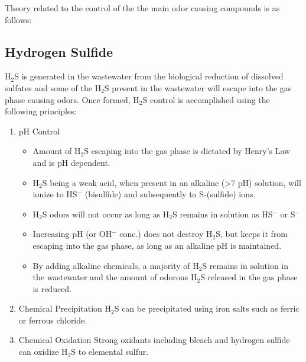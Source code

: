 Theory related to the control of the the main odor causing compounds is as follows:

\subsection{Hydrogen Sulfide}
H$_2$S is generated in the wastewater from the biological reduction of dissolved sulfates and some of the H$_2$S present in the wastewater will escape into the gas phase causing odors.  Once formed, H$_2$S control is accomplished using the following principles:
\begin{enumerate}
\item pH Control
\begin{itemize}
\item Amount of H$_2$S escaping into the gas phase is dictated by Henry’s Law and is pH dependent.
\item H$_2$S being a weak acid, when present in an alkaline (>7 pH) solution, will ionize to HS$^-$ (bisulfide) and subsequently to S-(sulfide) ions.
\item H$_2$S odors will not occur as long as H$_2$S remains in solution as HS$^-$ or S$^-$
\item Increasing pH (or OH$^-$ conc.) does not destroy H$_2$S, but keeps it from escaping into the gas phase, as long as an alkaline pH is maintained.
\item By adding alkaline chemicals, a majority of H$_2$S remains in solution in the wastewater and the amount of odorous H$_2$S released in the gas phase is reduced.
\end{itemize}
\item{Chemical Precipitation}
H$_2$S can be precipitated using iron salts such as ferric or ferrous chloride.
\item{Chemical Oxidation}
Strong oxidants including bleach and hydrogen sulfide can oxidize H$_2$S to elemental sulfur.
%	
\end{enumerate}

